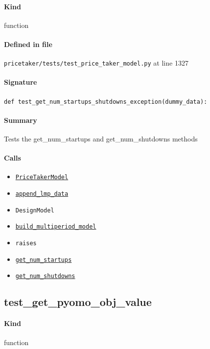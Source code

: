 \documentclass[11pt]{report}
\begin{document}
\paragraph{Kind} function
\paragraph{Defined in file} \texttt{pricetaker/tests/test\_price\_taker\_model.py} at line 1327
\paragraph{Signature} \texttt{def test\_get\_num\_startups\_shutdowns\_exception(dummy\_data):}
\paragraph{Summary} Tests the get\_num\_startups and get\_num\_shutdowns methods
\paragraph{Calls}
\begin{itemize}[leftmargin=*]
  \item \hyperref[def:pricetaker-price_taker_model.py:PriceTakerModel:L161]{\texttt{PriceTakerModel}}
  \item \hyperref[def:pricetaker-price_taker_model.py:PriceTakerModel.append_lmp_data:L221]{\texttt{append\_lmp\_data}}
  \item \texttt{DesignModel}
  \item \hyperref[def:pricetaker-price_taker_model.py:PriceTakerModel.build_multiperiod_model:L291]{\texttt{build\_multiperiod\_model}}
  \item \texttt{raises}
  \item \hyperref[def:pricetaker-price_taker_model.py:PriceTakerModel.get_num_startups:L1182]{\texttt{get\_num\_startups}}
  \item \hyperref[def:pricetaker-price_taker_model.py:PriceTakerModel.get_num_shutdowns:L1186]{\texttt{get\_num\_shutdowns}}
\end{itemize}
\subsection{test\_get\_pyomo\_obj\_value}
\label{def:pricetaker-tests-test_price_taker_model.py:test_get_pyomo_obj_value:L1359}
\paragraph{Kind} function
\end{document}
